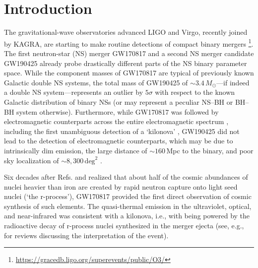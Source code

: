 
\section{Introduction}\label{sec:intro}

The gravitational-wave observatories advanced LIGO and Virgo, recently joined by KAGRA, are starting to make routine detections of compact binary mergers \cite{abbott_gwtc-1_2019,the_ligo_scientific_collaboration_gw190412_2020}\footnote{\href{https://gracedb.ligo.org/superevents/public/O3/}{https://gracedb.ligo.org/superevents/public/O3/}}. The first neutron-star (NS) merger GW170817 \cite{abbott_gw170817:_2017-1} and a second NS merger candidate GW190425 \cite{abbott_gw190425_2020} already probe drastically different parts of the NS binary parameter space. While the component masses of GW170817 are typical of previously known Galactic double NS systems, the total mass of GW190425 of $\sim\!3.4\,M_\odot$---if indeed a double NS system---represents an outlier by $5\sigma$ with respect to the known Galactic distribution of binary NSs \cite{abbott_gw190425_2020} (or may represent a peculiar NS--BH or BH--BH system otherwise). Furthermore, while GW170817 was followed by electromagnetic counterparts across the entire electromagnetic spectrum \cite{abbott_multi-messenger_2017}, including the first unambiguous detection of a `kilonova' \cite{li_transient_1998-1,kulkarni_modeling_2005-1,metzger_electromagnetic_2010,metzger_kilonovae_2019}, GW190425 did not lead to the detection of electromagnetic counterparts, which may be due to intrinsically dim emission, the large distance of $\sim\!160$\,Mpc to the binary, and poor sky localization of $\sim\!8,300\,\mathrm{deg}^2$ \cite{abbott_gw190425_2020,antier_first_2020,lundquist_searches_2019,hosseinzadeh_follow-up_2019,coughlin_implications_2020}.

Six decades after Refs. \cite{burbidge_synthesis_1957-1} and \cite{cameron_origin_1957} realized that about half of the cosmic abundances of nuclei heavier than iron are created by rapid neutron capture onto light seed nuclei (`the r-process'), GW170817 provided the first direct observation of cosmic synthesis of such elements. The quasi-thermal emission in the ultraviolet, optical, and near-infrared was consistent with a kilonova, i.e., with being powered by the radioactive decay of r-process nuclei synthesized in the merger ejecta (see, e.g., \cite{metzger_kilonovae_2019,siegel_gw170817_2019} for reviews discussing the interpretation of the event).

